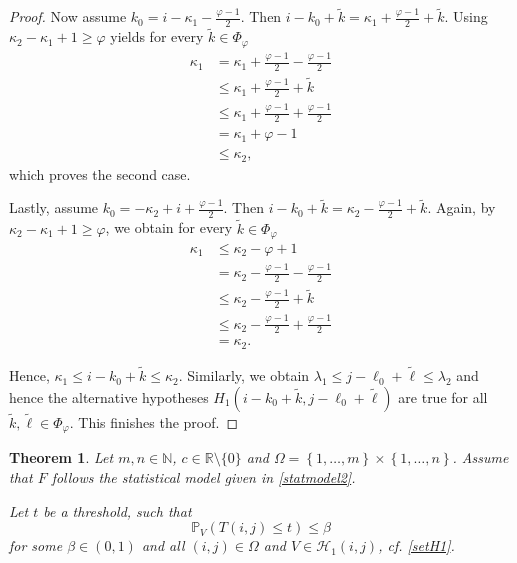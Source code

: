\documentclass[a4paper,12pt]{article}
\theoremstyle{plain}
\newtheorem{theorem}{Theorem}[section]
\theoremstyle{definition}
\numberwithin{equation}{section}
\begin{document}
\begin{appendix}
\begin{proof}
		Now assume $k_0 = i - \kappa_1 - \frac{\varphi - 1}{2}$. Then $i - k_0 + \tilde{k} = \kappa_1 + \frac{\varphi - 1}{2} + \tilde{k}$. Using $\kappa_2 - \kappa_1 + 1 \geq \varphi$ yields for every $\tilde{k} \in \Phi_\varphi$
		\begin{align*}
			\kappa_1 &= \kappa_1 + \frac{\varphi - 1}{2} - \frac{\varphi - 1}{2} \\
			&\leq \kappa_1 + \frac{\varphi - 1}{2} + \tilde{k} \\
			&\leq \kappa_1 + \frac{\varphi - 1}{2} + \frac{\varphi - 1}{2} \\
			&= \kappa_1 + \varphi - 1 \\
			&\leq \kappa_2,
		\end{align*}
		which proves the second case.
		
		Lastly, assume $k_0 = - \kappa_2 + i + \frac{\varphi - 1}{2}$. Then $i - k_0 + \tilde{k} = \kappa_2 - \frac{\varphi - 1}{2} + \tilde{k}$. Again, by $\kappa_2 - \kappa_1 + 1 \geq \varphi$, we obtain for every $\tilde{k} \in \Phi_\varphi$
		\begin{align*}
			\kappa_1 &\leq \kappa_2 - \varphi + 1 \\
			&= \kappa_2 - \frac{\varphi - 1}{2} - \frac{\varphi - 1}{2} \\
			&\leq \kappa_2 - \frac{\varphi - 1}{2} + \tilde{k} \\
			&\leq \kappa_2 - \frac{\varphi - 1}{2} + \frac{\varphi - 1}{2} \\
			&= \kappa_2.
		\end{align*}
		
		Hence, $\kappa_1 \leq i - k_0 + \tilde{k} \leq \kappa_2$. Similarly, we obtain $\lambda_1 \leq j - \ell_0 + \tilde{\ell} \leq \lambda_2$ and hence the alternative hypotheses $H_1(i - k_0 + \tilde{k}, j - \ell_0 + \tilde{\ell})$ are true for all $\tilde{k}, \tilde{\ell} \in \Phi_\varphi$. This finishes the proof.
	\end{proof}
	
	\newpage
	
	\begin{theorem}
		Let $m, n \in \mathbb{N}$, $c \in \mathbb{R} \setminus \{ 0 \}$ and $\Omega = \left\{ 1, \dots, m \right\} \times \left\{ 1, \dots, n \right\}$. Assume that $F$ follows the statistical model given in \eqref{statmodel2}.
		
		Let $t$ be a threshold, such that
		\begin{equation*}
			\mathbb{P}_V\left( T(i, j) \leq t \right) \leq \beta
		\end{equation*}
		for some $\beta \in (0, 1)$ and all $(i, j) \in \Omega$ and $V \in \mathcal{H}_1(i, j)$, cf. \eqref{setH1}.
		

\end{theorem}
\end{appendix}
\end{document}
